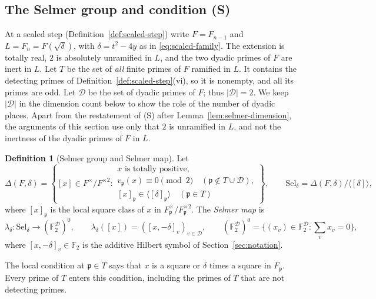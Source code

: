 \documentclass[11pt]{article}
\theoremstyle{plain}
\theoremstyle{definition}
\newtheorem{definition}[theorem]{Definition}
\theoremstyle{remark}
\newcommand{\F}{\mathbb F}
\begin{document}
\subsection{The Selmer group and condition (S)}\label{sec:dyadic-selmer}

At a scaled step (Definition~\ref{def:scaled-step}) write
$F=F_{n-1}$ and $L=F_n=F(\sqrt\delta)$, with $\delta=t^2-4y$ as in
\eqref{eq:scaled-family}.  The extension is totally real, $2$ is
absolutely unramified in $L$, and the two dyadic primes of $F$ are inert
in $L$.  Let $T$ be the set of \emph{all} finite primes of $F$ ramified
in $L$.  It contains the detecting primes of
Definition~\ref{def:scaled-step}(vi), so it is nonempty, and all its
primes are odd.  Let $\mathcal D$ be the set of dyadic primes of $F$;
thus $|\mathcal D|=2$.  We keep $|\mathcal D|$ in the dimension count
below to show the role of the number of dyadic places.  Apart from the
restatement of (S) after Lemma~\ref{lem:selmer-dimension}, the arguments
of this section use only that $2$ is unramified in $L$, and not the
inertness of the dyadic primes of $F$ in $L$.

\begin{definition}[Selmer group and Selmer map]\label{def:selmer}
Let
\[
 \Delta(F,\delta)=\left\{[x]\in F^\times/F^{\times2}:
 \begin{array}{l}
 x\text{ is totally positive},\\
 v_{\mathfrak p}(x)\equiv0\pmod2\quad(\mathfrak p\notin T\cup\mathcal D),\\
 {}[x]_{\mathfrak p}\in\langle[\delta]_{\mathfrak p}\rangle\quad(\mathfrak p\in T)
 \end{array}\right\},\qquad
 \mathrm{Sel}_\delta=\Delta(F,\delta)/\langle[\delta]\rangle,
\]
where $[x]_{\mathfrak p}$ is the local square class of $x$ in
$F_{\mathfrak p}^\times/F_{\mathfrak p}^{\times2}$.  The \emph{Selmer map}
is
\[
 \lambda_\delta:\mathrm{Sel}_\delta\longrightarrow(\F_2^{\mathcal D})^0,\qquad
 \lambda_\delta([x])=([x,-\delta]_v)_{v\in\mathcal D},
 \qquad
 (\F_2^{\mathcal D})^0=\{(x_v)\in\F_2^{\mathcal D}:\textstyle\sum_vx_v=0\},
\]
where $[x,-\delta]_v\in\F_2$ is the additive Hilbert symbol of
Section~\ref{sec:notation}.
\end{definition}

The local condition at $\mathfrak p\in T$ says that $x$ is a square or
$\delta$ times a square in $F_{\mathfrak p}$.  Every prime of $T$ enters
this condition, including the primes of $T$ that are not detecting
primes.
\end{document}
